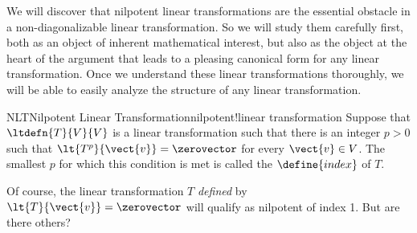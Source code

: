 %
%
We will discover that nilpotent linear transformations are the essential obstacle in a non-diagonalizable linear transformation.  So we will study them carefully first, both as an object of inherent mathematical interest, but also as the object at the heart of the argument that leads to a pleasing canonical form for any linear transformation.  Once we understand these linear transformations thoroughly, we will be able to easily analyze the structure of any linear transformation.\par
%
%
\begin{definition}{NLT}{Nilpotent Linear Transformation}{nilpotent!linear transformation}
Suppose that $\ltdefn{T}{V}{V}$ is a linear transformation such that there is an integer $p>0$ such that $\lt{T^p}{\vect{v}}=\zerovector$ for every $\vect{v}\in V$.  The smallest $p$ for which this condition is met is called the $\define{index}$ of $T$.
\end{definition}
%
Of course, the linear transformation $T$ {\em defined} by $\lt{T}{\vect{v}}=\zerovector$ will qualify as nilpotent of index 1.  But are there others?
%
